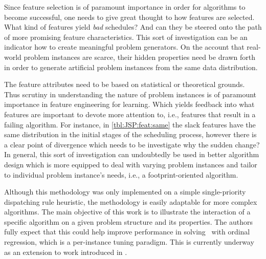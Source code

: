 Since feature selection is of paramount importance in order for algorithms to become successful, one needs to give great thought to how features are selected. What kind of features yield \emph{bad} schedules? And can they be steered onto the path of more promising feature characteristics. This sort of investigation can be an indicator how to create meaningful problem generators. On the account that real-world problem instances are scarce, their hidden properties need be drawn forth in order to generate artificial problem instances from the same data distribution. 

The feature attributes need to be based on statistical or theoretical grounds. Thus scrutiny in understanding the nature of problem instances is of paramount importance in feature engineering for learning. Which yields feedback into what features are important to devote more attention to, i.e., features that result in a failing algorithm. For instance, in \cref{tbl:JSP:feat:same} the slack features have the same distribution in the initial stages of the scheduling process, however there is a clear point of divergence which needs to be investigate why the sudden change? 
In general, this sort of investigation can undoubtedly be used in better algorithm design which is more equipped to deal with varying problem instances and tailor to individual problem instance's needs, i.e., a footprint-oriented algorithm. 

Although this methodology was only implemented on a simple single-priority dispatching rule heuristic, the methodology is easily adaptable for more complex algorithms. The main objective of this work is to illustrate the interaction of a specific algorithm on a given problem structure and its properties.
The authors fully expect that this could help improve performance in solving \JSP\ with ordinal regression, which is a per-instance tuning paradigm. This is currently underway as an extension to work introduced in \cite{InRu11a}.


